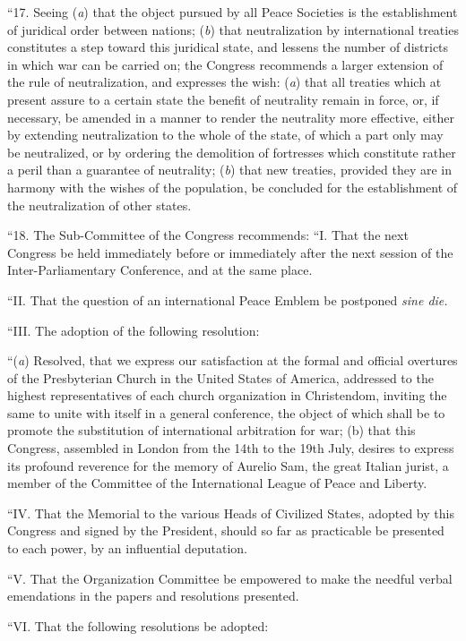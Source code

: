 \documentclass{book}
\begin{document}
“17. Seeing (\emph{a}) that the object pursued by all Peace Societies is the establishment of juridical order between nations; (\emph{b}) that neutralization by international treaties constitutes a step toward this juridical state, and lessens the number of districts in which war can be carried on; the Congress recommends a larger extension of the rule of neutralization, and expresses the wish: (\emph{a}) that all treaties which at present assure to a certain state the benefit of neutrality remain in force, or, if necessary, be amended in a manner to render the neutrality more effective, either by extending neutralization to the whole of the state, of which a part only may be neutralized, or by ordering the demolition of fortresses which constitute rather a peril than a guarantee of neutrality; (\emph{b}) that new treaties, provided they are in harmony with the wishes of the population, be concluded for the establishment of the neutralization of other states.

“18. The Sub-Committee of the Congress recommends: “I. That the next Congress be held immediately before or immediately after the next session of the Inter-Parliamentary Conference, and at the same place.

“II. That the question of an international Peace Emblem be postponed \emph{sine die.}

“III. The adoption of the following resolution:

“(\emph{a}) Resolved, that we express our satisfaction at the formal and official overtures of the Presbyterian Church in the United States of America, addressed to the highest representatives of each church organization in Christendom, inviting the same to unite with itself in a general conference, the object of which shall be to promote the substitution of international arbitration for war; (b) that this Congress, assembled in London from the 14th to the 19th July, desires to express its profound reverence for the memory of Aurelio Sam, the great Italian jurist, a member of the Committee of the International League of Peace and Liberty.

“IV. That the Memorial to the various Heads of Civilized States, adopted by this Congress and signed by the President, should so far as practicable be presented to each power, by an influential deputation.

“V. That the Organization Committee be empowered to make the needful verbal emendations in the papers and resolutions presented.

“VI. That the following resolutions be adopted:
\end{document}
